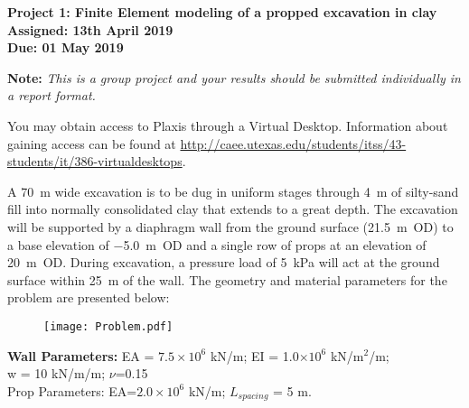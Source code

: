 \documentclass[a4paper,12pt]{article}
\begin{document}
\begin{centering}
	\textbf{
		Project 1: Finite Element modeling of a propped excavation in clay\\
		Assigned: 13th April 2019\\
		Due: 01 May 2019\\
	}
\end{centering}

\vspace{1em}

\textbf{Note: }\textit{This is a group project and your results should be submitted 
	individually in a report format.}

You may obtain access to Plaxis through a Virtual Desktop.  Information about gaining access can be found at \url{ http://caee.utexas.edu/students/itss/43-students/it/386-virtualdesktops}.  

A \SI{70}{\meter} wide excavation is to be dug in uniform stages through 
\SI{4}{\meter} of silty-sand fill into normally consolidated clay that 
extends to a great depth. The excavation will be supported by a diaphragm wall 
from the ground surface (\SI{+21.5}{\meter}~OD) to a base elevation of 
\SI{-5.0}{\meter}~OD and a single row of props at an elevation of 
\SI{+20}{\meter}~OD.  During excavation, a pressure 
load of \SI{5}{\kilo\pascal} will act at the ground surface within 
\SI{25}{\meter} of the wall.  The geometry and material parameters for the 
problem are presented below:

\begin{figure}[h]
	\texttt{[image: Problem.pdf]}
\end{figure}

\begin{center}
	\textbf{Wall Parameters:} EA = $7.5\times 10^6$ kN/m; EI = 1.0$\times10^6$ 
	kN/m$^2$/m; \\ w = 10 kN/m/m; $\nu$=0.15 \\
	Prop Parameters: EA=$2.0\times10^6$ kN/m; $L_{spacing}$ = 5 m.
\end{center}
\end{document}
